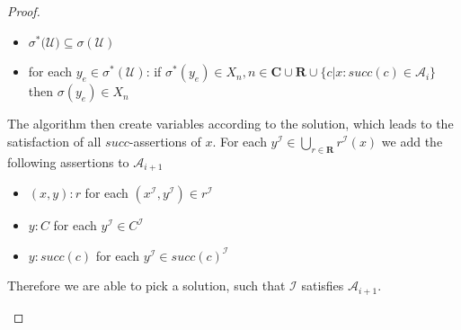 \documentclass{book}
\theoremstyle{break}
\theoremstyle{definition}
\begin{document}
\begin{proof}
\begin{itemize}
\begin{itemize}
\item $\sigma^\ast(\mathcal{U)}\subseteq\sigma(\mathcal{U})$
\item for each $y_e\in \sigma^\ast(\mathcal{U})$: if $\sigma^\ast(y_e)\in X_n, n\in\mathbf{C}\cup\mathbf{R}\cup\{c|x:succ(c)\in \mathcal{A}_i\}$ then $\sigma(y_e)\in X_n$
\end{itemize}
The algorithm then create variables according to the solution, which leads to the satisfaction of all $succ$-assertions of $x$. For each $y^\mathcal{I}\in\bigcup_{r\in\mathbf{R}}r^\mathcal{I}(x)$ we add the following assertions to $\mathcal{A}_{i+1}$
\begin{itemize}
\item $(x,y):r$ for each $(x^{\mathcal{I}},y^{\mathcal{I}})\in r^{\mathcal{I}}$
\item $y:C$ for each $y^\mathcal{I}\in C^\mathcal{I}$
\item $y:succ(c)$ for each $y^\mathcal{I}\in succ(c)^\mathcal{I}$
\end{itemize}
Therefore we are able to pick a solution, such that $\mathcal{I}$ satisfies $\mathcal{A}_{i+1}$.
\end{itemize}
\end{proof}
\normalem


\end{document}
